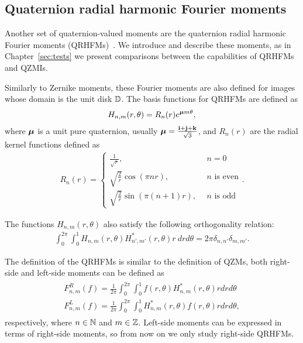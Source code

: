 \subsection{Quaternion radial harmonic Fourier moments}
Another set of quaternion-valued moments are the quaternion radial harmonic Fourier moments (QRHFMs)~\cite{Wang, WangAcc, LiuAcc}. We introduce and describe these moments, as in Chapter~\ref{sec:tests} we present comparisons between the capabilities of QRHFMs and QZMIs.


Similarly to Zernike moments, these Fourier moments are also defined for images whose domain is the unit disk $\mathbb{D}$. The basis functions for QRHFMs are defined as
\begin{gather*}
    H_{n,m}(r,\theta) = R_n(r)e^{\boldsymbol{\mu} m \theta},
\end{gather*}
where $\boldsymbol{\mu}$ is a unit pure quaternion, usually $\boldsymbol{\mu} = \frac{\mathbf{i} + \mathbf{j} + \mathbf{k}}{\sqrt{3}}$, and $R_n(r)$ are the radial kernel functions defined as
\begin{gather} \label{eq:qrhfm_radial}
    R_n(r) = \begin{cases}
        \frac{1}{\sqrt{r}}, &n = 0\\
        \sqrt{\frac{2}{r}}\cos(\pi n r), &n \text{ is even}\\
        \sqrt{\frac{2}{r}}\sin(\pi (n+1) r), \ \ &n \text{ is odd}
    \end{cases}.
\end{gather}

The functions $H_{n,m}(r,\theta)$ also satisfy the following orthogonality relation:
\begin{gather*}
     \int_0^{2\pi} \int_0^1 H_{n,m}(r,\theta) H^*_{n',m'}(r,\theta) r \ dr d \theta = 2\pi\delta_{n,n'}\delta_{m,m'}.
\end{gather*}


The definition of the QRHFMs is similar to the definition of QZMs, both right-side and left-side moments can be defined as
\begin{gather} \label{eq:QRHFM}
    \begin{split}F_{n,m}^R(f) = \frac{1}{2\pi}\int_0^{2\pi} \int_0^1 f(r,\theta)H_{n,m}^*(r,\theta) r dr d \theta \\
    F_{n,m}^L(f) = \frac{1}{2\pi}\int_0^{2\pi} \int_0^1 H_{n,m}^*(r,\theta)f(r,\theta) r dr d \theta,
    \end{split}
\end{gather} respectively, where $n \in \mathbb{N}$ and $m \in \mathbb{Z}$. Left-side moments can be expressed in terms of right-side moments, so from now on we only study right-side QRHFMs.



